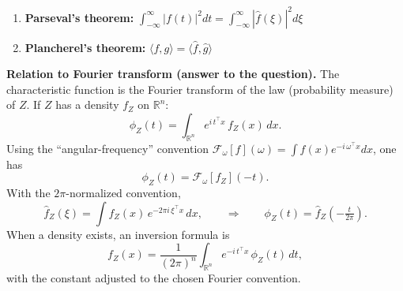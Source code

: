 \begin{answerenum}
\begin{enumerate}
            \item \textbf{Parseval's theorem:} $\int_{-\infty}^{\infty} |f(t)|^2 dt = \int_{-\infty}^{\infty} |\hat{f}(\xi)|^2 d\xi$
            
            \item \textbf{Plancherel's theorem:} $\langle f, g \rangle = \langle \hat{f}, \hat{g} \rangle$
        \end{enumerate}

        \textbf{Relation to Fourier transform (answer to the question).}
        The characteristic function is the Fourier transform of the law (probability measure) of $Z$. If $Z$ has a density $f_Z$ on $\mathbb{R}^n$:
        \[
            \phi_Z(t)=\int_{\mathbb{R}^n} e^{i\,t^\top x}\,f_Z(x)\,dx.
        \]
        Using the “angular-frequency” convention $\mathcal{F}_\omega[f](\omega)=\int f(x)e^{-i\,\omega^\top x}dx$, one has
        \[
            \phi_Z(t)=\mathcal{F}_\omega[f_Z](-t).
        \]
        With the $2\pi$-normalized convention,
        \[
            \hat f_Z(\xi)=\int f_Z(x)\,e^{-2\pi i\,\xi^\top x}\,dx,
            \qquad\Rightarrow\qquad
            \phi_Z(t)=\hat f_Z\!\left(-\tfrac{t}{2\pi}\right).
        \]
        When a density exists, an inversion formula is
        \[
            f_Z(x)=\frac{1}{(2\pi)^n}\int_{\mathbb{R}^n} e^{-i\,t^\top x}\,\phi_Z(t)\,dt,
        \]
        with the constant adjusted to the chosen Fourier convention.
\end{answerenum}